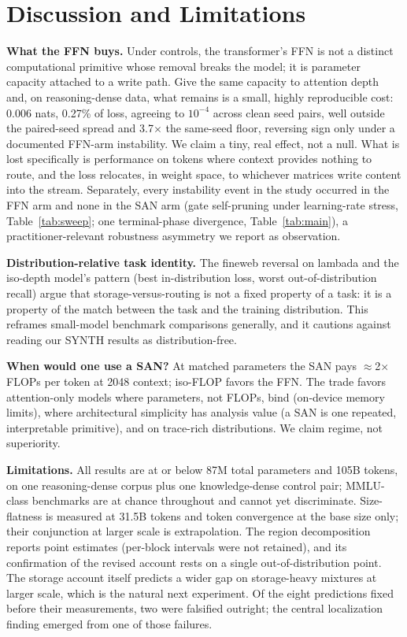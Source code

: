 \documentclass[letterpaper]{article} %
\begin{document}
\section{Discussion and Limitations}

\textbf{What the FFN buys.} Under controls, the transformer's FFN is not
a distinct computational primitive whose removal breaks the model; it is
parameter capacity attached to a write path. Give the same capacity to
attention depth and, on reasoning-dense data, what remains is a small,
highly reproducible cost: 0.006 nats, 0.27\% of loss, agreeing to
$10^{-4}$ across clean seed pairs, well outside the paired-seed spread
and 3.7$\times$ the same-seed floor, reversing sign only under a
documented FFN-arm instability. We claim a tiny, real effect, not a null.
What is lost specifically is performance on tokens where context provides
nothing to route, and the loss relocates, in weight space, to whichever
matrices write content into the stream. Separately, every instability
event in the study occurred in the FFN arm and none in the SAN arm
(gate self-pruning under learning-rate stress, Table~\ref{tab:sweep};
one terminal-phase divergence, Table~\ref{tab:main}), a
practitioner-relevant robustness asymmetry
we report as observation.

\textbf{Distribution-relative task identity.} The fineweb reversal on
lambada and the iso-depth model's pattern (best in-distribution loss,
worst out-of-distribution recall) argue that storage-versus-routing is
not a fixed property of a task: it is a property of the match between the
task and the training distribution. This reframes small-model benchmark
comparisons generally, and it cautions against reading our SYNTH results
as distribution-free.

\textbf{When would one use a SAN?} At matched parameters the SAN pays
$\approx$2$\times$ FLOPs per token at 2048 context; iso-FLOP favors the
FFN. The trade favors attention-only models where parameters, not FLOPs,
bind (on-device memory limits), where architectural simplicity has
analysis value (a SAN is one repeated, interpretable primitive), and on
trace-rich distributions. We claim regime, not superiority.

\textbf{Limitations.} All results are at or below 87M total parameters
and 105B tokens, on one reasoning-dense corpus plus one knowledge-dense
control pair; MMLU-class benchmarks are at chance throughout and cannot
yet discriminate. Size-flatness is measured at 31.5B tokens and token
convergence at the base size only; their conjunction at larger scale is
extrapolation. The region decomposition reports point estimates
(per-block intervals were not retained), and its confirmation of the
revised account rests on a single out-of-distribution point. The storage account itself predicts a wider gap on
storage-heavy mixtures at larger scale, which is the natural next
experiment. Of the eight predictions fixed before their measurements, two
were falsified outright; the central localization finding emerged from
one of those failures.
\end{document}
